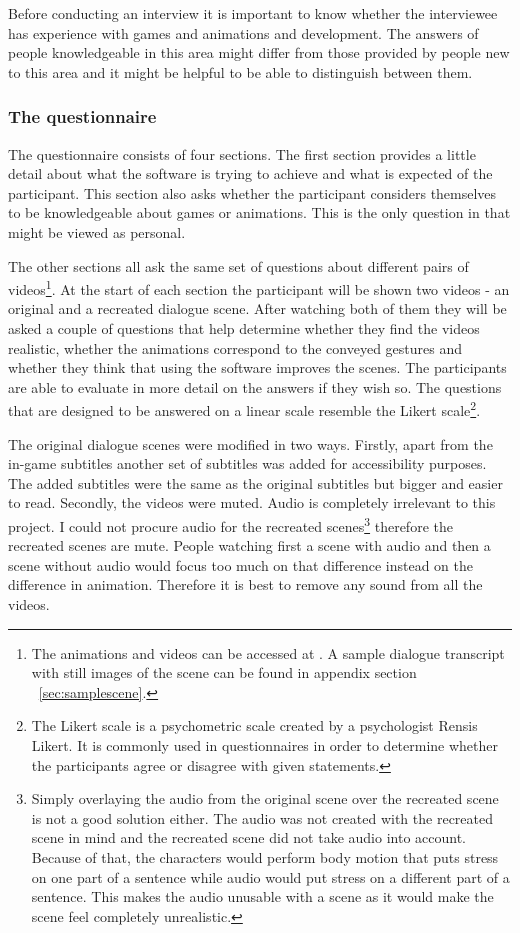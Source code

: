 Before conducting an interview it is important to know whether the interviewee has experience with games and animations and development. The answers of people knowledgeable in this area might differ from those provided by people new to this area and it might be helpful to be able to distinguish between them.

\medskip
\subsubsection{The questionnaire}
The questionnaire consists of four sections. The first section provides a little detail about what the software is trying to achieve and what is expected of the participant. This section also asks whether the participant considers themselves to be knowledgeable about games or animations. This is the only question in that might be viewed as personal.

The other sections all ask the same set of questions about different pairs of videos\footnote{The animations and videos can be accessed at \videoshost. A sample dialogue transcript with still images of the scene can be found in appendix section ~\ref{sec:samplescene}.}. At the start of each section the participant will be shown two videos - an original and a recreated dialogue scene. After watching both of them they will be asked a couple of questions that help determine whether they find the videos realistic, whether the animations correspond to the conveyed gestures and whether they think that using the software improves the scenes. The participants are able to evaluate in more detail on the answers if they wish so. The questions that are designed to be answered on a linear scale resemble the Likert scale\footnote{The Likert scale is a psychometric scale created by a psychologist Rensis Likert. It is commonly used in questionnaires in order to determine whether the participants agree or disagree with given statements.}.

The original dialogue scenes were modified in two ways. Firstly, apart from the in-game subtitles another set of subtitles was added for accessibility purposes. The added subtitles were the same as the original subtitles but bigger and easier to read. Secondly, the videos were muted. Audio is completely irrelevant to this project. I could not procure audio for the recreated scenes\footnote{Simply overlaying the audio from the original scene over the recreated scene is not a good solution either. The audio was not created with the recreated scene in mind and the recreated scene did not take audio into account. Because of that, the characters would perform body motion that puts stress on one part of a sentence while audio would put stress on a different part of a sentence. This makes the audio unusable with a scene as it would make the scene feel completely unrealistic.} therefore the recreated scenes are mute. People watching first a scene with audio and then a scene without audio would focus too much on that difference instead on the difference in animation. Therefore it is best to remove any sound from all the videos.

